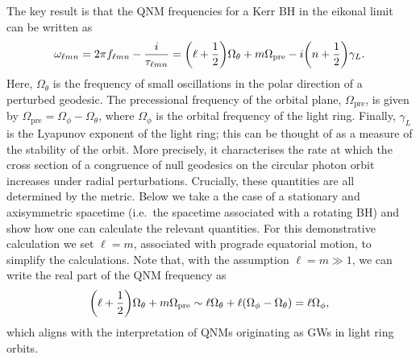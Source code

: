 The key result is that the QNM frequencies for a Kerr BH in the eikonal limit can be written as
\begin{equation}\label{ch1:eq:eikonalomega}
    \omega_{\ell m n} = 2\pi f_{\ell m n} - \frac{i}{\tau_{\ell m n}} = \qty(\ell + \frac{1}{2}) \Omega_\theta + m \Omega_\mathrm{pre} - i \qty(n + \frac{1}{2}) \gamma_L.
\end{equation}
Here, $\Omega_\theta$ is the frequency of small oscillations in the polar direction of a perturbed geodesic. 
The precessional frequency of the orbital plane, $\Omega_\mathrm{pre}$, is given by $\Omega_\mathrm{pre} = \Omega_\phi - \Omega_\theta$, where $\Omega_\phi$ is the orbital frequency of the light ring.
Finally, $\gamma_L$ is the Lyapunov exponent of the light ring; this can be thought of as a measure of the stability of the orbit.
More precisely, it characterises the rate at which the cross section of a congruence of null geodesics on the circular photon orbit increases under radial perturbations.
Crucially, these quantities are all determined by the metric. 
Below we take a the case of a stationary and axisymmetric spacetime (i.e.\ the spacetime associated with a rotating BH) and show how one can calculate the relevant quantities.
For this demonstrative calculation we set $\ell = m$, associated with prograde equatorial motion, to simplify the calculations.
Note that, with the assumption $\ell = m \gg 1$, we can write the real part of the QNM frequency as
\begin{equation}
    \qty(\ell + \frac{1}{2}) \Omega_\theta + m \Omega_\mathrm{pre} \sim \ell \Omega_\theta + \ell \qty(\Omega_\phi - \Omega_\theta) = \ell \Omega_\phi,
\end{equation}
which aligns with the interpretation of QNMs originating as GWs in light ring orbits.

